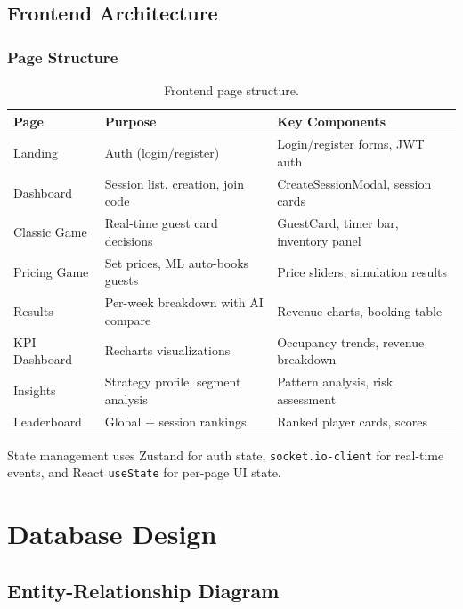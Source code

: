\documentclass[12pt,a4paper,openany]{report}
\begin{document}
\section{Frontend Architecture}

\subsection{Page Structure}

\begin{table}[H]
\centering
\caption{Frontend page structure.}
\label{tab:pages}
\small
\begin{tabular}{@{}lll@{}}
\toprule
\textbf{Page} & \textbf{Purpose} & \textbf{Key Components} \\
\midrule
Landing       & Auth (login/register)            & Login/register forms, JWT auth \\
Dashboard     & Session list, creation, join code & CreateSessionModal, session cards \\
Classic Game  & Real-time guest card decisions    & GuestCard, timer bar, inventory panel \\
Pricing Game  & Set prices, ML auto-books guests  & Price sliders, simulation results \\
Results       & Per-week breakdown with AI compare& Revenue charts, booking table \\
KPI Dashboard & Recharts visualizations           & Occupancy trends, revenue breakdown \\
Insights      & Strategy profile, segment analysis& Pattern analysis, risk assessment \\
Leaderboard   & Global + session rankings         & Ranked player cards, scores \\
\bottomrule
\end{tabular}
\end{table}

State management uses Zustand for auth state, \texttt{socket.io-client} for real-time events, and React \texttt{useState} for per-page UI state.


\chapter{Database Design}
\label{ch:database}

\section{Entity-Relationship Diagram}
\end{document}
